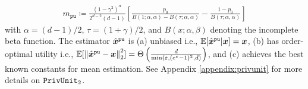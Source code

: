 \begin{align}
    m_{\texttt{pu}} \coloneqq  \frac{(1 - \gamma^2)^\alpha}{2^{d-2} (d - 1)}
  \left[\frac{p_0}{B(1; \alpha,\alpha) - B(\tau; \alpha,\alpha)}
     - \frac{1 - p_0}{B(\tau; \alpha, \alpha)}\right]
  \label{eq:m}
\end{align}
with $\alpha = (d-1)/2$, $\tau = (1+\gamma)/2$, and $B(x;\alpha,\beta)$ denoting the incomplete beta function. The estimator $\hat{{\boldsymbol{x}}}^{\texttt{pu}}$ is (a) unbiased i.e., $\mathbb{E}[\hat{{\boldsymbol{x}}}^{\texttt{pu}} | {\boldsymbol{x}}] = {\boldsymbol{x}}$, (b) has order-optimal utility i.e., $\mathbb{E}[\left\|{\hat{{\boldsymbol{x}}}^{\texttt{pu}} - {\boldsymbol{x}}}\right\|_2^2] = \Theta\left(
   \frac{d}{\min\left(\varepsilon, (e^\varepsilon-1)^2, d\right)}\right)$, and (c) achieves the best known constants for mean estimation. See Appendix \ref{appendix:privunit} for more details on $\texttt{PrivUnit}_2$.



